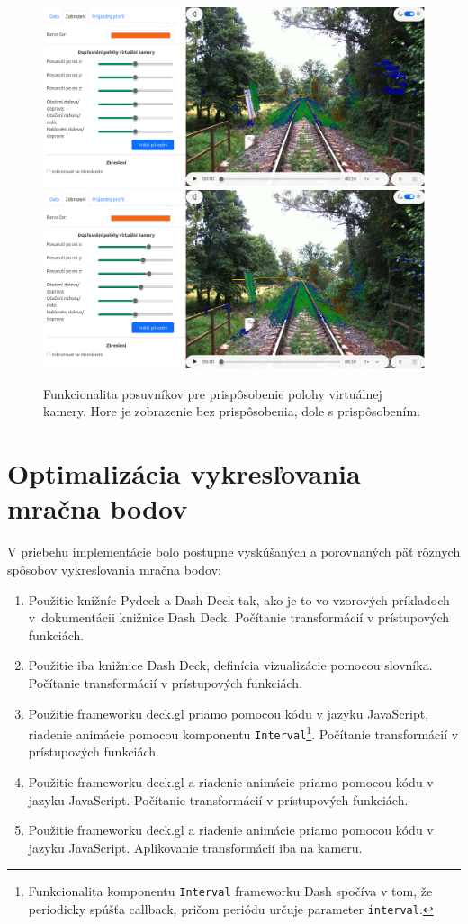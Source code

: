 \begin{figure}[h]
    \centering
    \includegraphics[width=0.9\linewidth]{text_prace/obrazky-figures/posuvniky1.png}
    \includegraphics[width=0.9\linewidth]{text_prace/obrazky-figures/posuvniky2.png}
    \caption{Funkcionalita posuvníkov pre prispôsobenie polohy virtuálnej kamery. Hore je zobrazenie bez prispôsobenia, dole s prispôsobením.}
    \label{fig:posuvniky}
\end{figure}

\section{Optimalizácia vykresľovania mračna bodov}

V priebehu implementácie bolo postupne vyskúšaných a porovnaných päť rôznych spôsobov vykresľovania mračna bodov:
\begin{enumerate}
    \item Použitie knižníc Pydeck a Dash Deck tak, ako je to vo vzorových príkladoch v~dokumentácii knižnice Dash Deck. Počítanie transformácií v prístupových funkciách.
    \item Použitie iba knižnice Dash Deck, definícia vizualizácie pomocou slovníka. Počítanie transformácií v prístupových funkciách.
    \item Použitie frameworku deck.gl priamo pomocou kódu v jazyku JavaScript, riadenie animácie pomocou komponentu \texttt{Interval}\footnote{Funkcionalita komponentu \texttt{Interval} frameworku Dash spočíva v tom, že periodicky spúšťa callback, pričom periódu určuje parameter \texttt{interval}.}. Počítanie transformácií v prístupových funkciách. 
    \item Použitie frameworku deck.gl a riadenie animácie priamo pomocou kódu v jazyku JavaScript. Počítanie transformácií v prístupových funkciách.
    \item Použitie frameworku deck.gl a riadenie animácie priamo pomocou kódu v jazyku JavaScript. Aplikovanie transformácií iba na kameru.
\end{enumerate}

